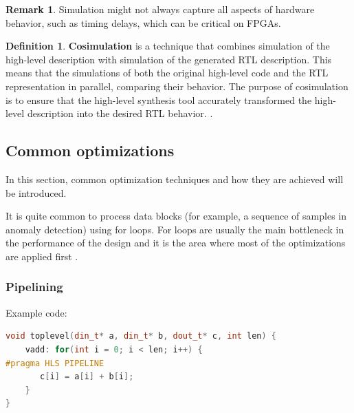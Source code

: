 \documentclass[a4paper, twoside]{report}
\theoremstyle{definition}
\newtheorem{definition}[theorem]{Definition}
\newtheorem{remark}[theorem]{Remark}
\numberwithin{equation}{section}
\begin{document}
\begin{remark}
    Simulation might not always capture all aspects of hardware behavior, such as timing delays, which can be critical on FPGAs.
\end{remark}

\begin{definition}
    \textbf{Cosimulation} is a technique that combines simulation of the high-level description with simulation of the generated RTL description.
    This means that the simulations of both the original high-level code and the RTL representation in parallel, comparing their behavior.
    The purpose of cosimulation is to ensure that the high-level synthesis tool accurately transformed the high-level description into the desired RTL behavior.
    \cite{AMD2023VitisSimCosim}.
\end{definition}


\subsection{Common optimizations}

In this section, common optimization techniques and how they are achieved will be introduced.

It is quite common to process data blocks
(for example, a sequence of samples in anomaly detection) using for loops.
For loops are usually the main bottleneck in the performance of the design
and it is the area where most of the optimizations are applied first \cite{AMD2023VitisHLS}.







\subsubsection{Pipelining} \label{sec:pipelining}


Example code:
\begin{lstlisting}[language=c++,numbers=none]
void toplevel(din_t* a, din_t* b, dout_t* c, int len) {
	vadd: for(int i = 0; i < len; i++) {
#pragma HLS PIPELINE
	   c[i] = a[i] + b[i];
	}
}
\end{lstlisting}
\end{document}
